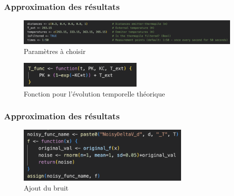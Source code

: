 \documentclass{beamer}
\begin{document}
\begin{frame}
\frametitle{Approximation des résultats}

\begin{figure}
\includegraphics[height=0.5in]{Fig/stefan-params.png}
\caption{Paramètres à choisir}
\end{figure}

\begin{figure}
\includegraphics[height=0.5in]{Fig/evol-temporelle.png}
\caption{Fonction pour l'évolution temporelle théorique}
\end{figure}

\end{frame}





\begin{frame}
\frametitle{Approximation des résultats}

\begin{figure}
\includegraphics[width=0.75\textwidth]{Fig/bruit.png}
\caption{Ajout du bruit}
\end{figure}

\end{frame}
\end{document}
